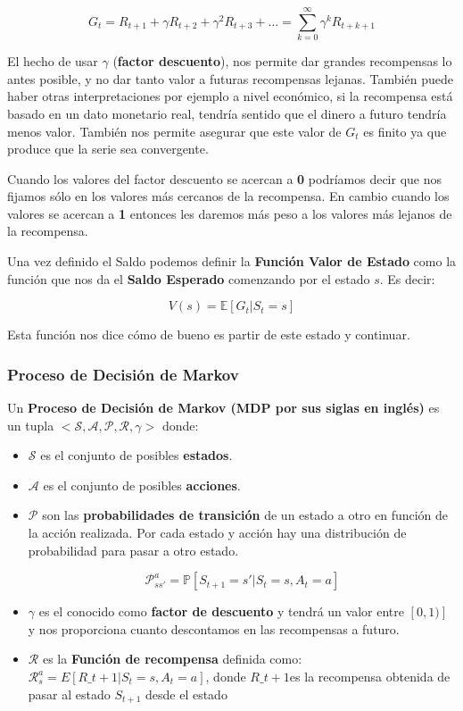 \documentclass[
  a4paper,
  DIV=11,
  numbers=noendperiod]{scrreprt}
\begin{document}
\[
G_t = R_{t+1} + \gamma R_{t+2} + \gamma^2 R_{t+3} + ... = \sum_{k=0}^\infty\gamma^kR_{t+k+1}
\]

El hecho de usar \(\gamma\) (\textbf{factor descuento}), nos permite dar
grandes recompensas lo antes posible, y no dar tanto valor a futuras
recompensas lejanas. También puede haber otras interpretaciones por
ejemplo a nivel económico, si la recompensa está basado en un dato
monetario real, tendría sentido que el dinero a futuro tendría menos
valor. También nos permite asegurar que este valor de \(G_t\) es finito
ya que produce que la serie sea convergente.

Cuando los valores del factor descuento se acercan a \textbf{0}
podríamos decir que nos fijamos sólo en los valores más cercanos de la
recompensa. En cambio cuando los valores se acercan a \textbf{1}
entonces les daremos más peso a los valores más lejanos de la
recompensa.

Una vez definido el Saldo podemos definir la \textbf{Función Valor de
Estado} como la función que nos da el \textbf{Saldo Esperado} comenzando
por el estado \(s\). Es decir:

\[
V(s) = \mathbb E[G_t|S_t=s]
\]

Esta función nos dice cómo de bueno es partir de este estado y
continuar.

\hypertarget{proceso-de-decisiuxf3n-de-markov}{%
\subsubsection{Proceso de Decisión de
Markov}\label{proceso-de-decisiuxf3n-de-markov}}

Un \textbf{Proceso de Decisión de Markov (MDP por sus siglas en inglés)}
es un tupla \(<\mathcal S,\mathcal A,\mathcal P,\mathcal R, \gamma >\)
donde:

\begin{itemize}
\item
  \(\mathcal S\) es el conjunto de posibles \textbf{estados}.
\item
  \(\mathcal A\) es el conjunto de posibles \textbf{acciones}.
\item
  \(\mathcal P\) son las \textbf{probabilidades de transición} de un
  estado a otro en función de la acción realizada. Por cada estado y
  acción hay una distribución de probabilidad para pasar a otro estado.

  \[
  \mathcal P_{ss'}^a=\mathbb P[S_{t+1}=s'|S_t=s,A_t=a]\]
\item
  \(\gamma\) es el conocido como \textbf{factor de descuento} y tendrá
  un valor entre \([0,1)]\) y nos proporciona cuanto descontamos en las
  recompensas a futuro.
\item
  \(\mathcal R\) es la \textbf{Función de recompensa} definida como:
  \(\mathcal R_s^a=E[R\_{t+1}|S_t=s, A_t=a]\), donde \(R\_{t+1}\)es la
  recompensa obtenida de pasar al estado \(S_{t+1}\) desde el estado
\end{itemize}
\end{document}
